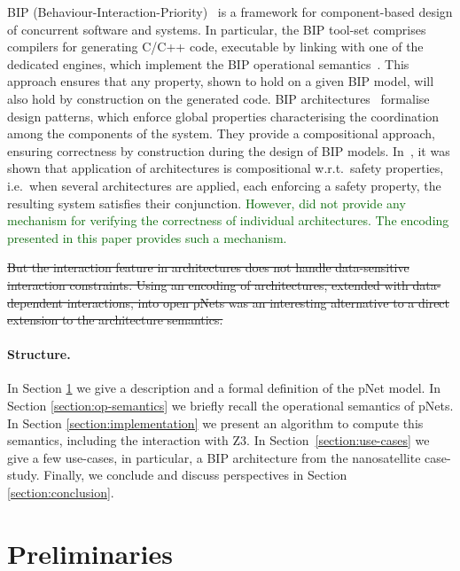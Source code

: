 \documentclass[smallcondensed]{svjour3}
\newcommand{\Simon}[1]{\textcolor{darkgreen}{#1}}
\newcommand{\ie}[1][\ ]{i.e.#1}
\newcommand{\wrt}[1][\ ]{w.r.t.#1}
\begin{document}
BIP
(Behaviour-Interaction-Priority)~\cite{bip} is a framework for 
component-based design of concurrent software and systems.  In
particular, the BIP tool-set comprises compilers for generating C/C++
code, executable by linking with one of the dedicated engines, which
implement the BIP operational semantics~\cite{BarBliu15-offer-scico}.  This
approach ensures that any property, shown to hold on a given BIP
model, will also hold by construction on the generated code.
BIP architectures~\cite{AttieBBJS16-architectures-faoc} formalise
design patterns, which enforce global properties 
characterising the coordination among the components of the
system. They provide a compositional approach, ensuring
correctness by construction during the design of BIP models.
In~\cite{AttieBBJS16-architectures-faoc}, it was shown that
application of architectures is compositional \wrt safety properties,
\ie when several architectures are applied, each enforcing a safety
property, the resulting system satisfies their conjunction.
%
\Simon{However, \cite{AttieBBJS16-architectures-faoc} did not provide
  any mechanism for verifying the correctness of individual
  architectures.  The encoding presented in this paper provides such a
  mechanism.}

\st{But the interaction feature in architectures does not handle
data-sensitive interaction constraints. Using an encoding of
architectures, extended with data-dependent interactions, into open
pNets was an interesting alternative to a direct extension to the
architecture semantics.}

\paragraph{Structure.}
In Section
\ref{section:pnets} we give a description and a formal definition of
the pNet model. 
In Section \ref{section:op-semantics} we briefly recall  the operational semantics
of pNets.
In Section \ref{section:implementation} we present an algorithm to compute this semantics, including the interaction with Z3.
In Section~\ref{section:use-cases} we give a few use-cases, in particular, a BIP
architecture from the nanosatellite case-study. 
Finally, we conclude and discuss perspectives in Section
\ref{section:conclusion}. 




\section{Preliminaries}
\label{section:pnets}
\end{document}
